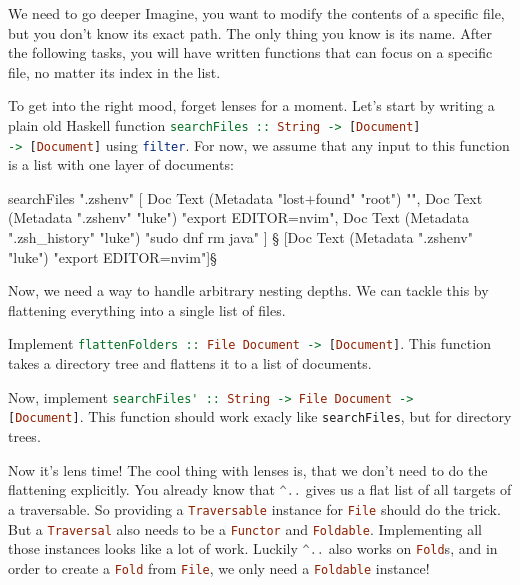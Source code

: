 \documentclass{exercise}
\makeatletter
\def\ergo{\smile@lst@style@comment\raisebox{.1pt}{\scalebox{.8}{\faCaretRight}}}
\newcommand\h[2][]{\lstinline[language=haskell,#1]{#2}}
\def\m#1{\tikzmark{#1}}
\makeatother
\begin{document}
\begin{exercise}{We need to go deeper}
		Imagine, you want to modify the contents of a specific file, but you don't know
		its exact path. The only thing you know is its name. After the following tasks,
		you will have written functions that can focus on a specific file, no matter
		its index in the list.
		\begin{tasks}[resume*]
			\item To get into the right mood, forget lenses for a moment. Let's start by
				writing a plain old Haskell function \h{searchFiles :: String -> [Document]
				-> [Document]} using \h{filter}. For now, we assume that any input to
				this function is a list with one layer of documents:
				\begin{haskell}
searchFiles ".zshenv" [
  Doc Text (Metadata "lost+found" "root") "",
  Doc Text (Metadata ".zshenv" "luke") "export EDITOR=nvim",
  Doc Text (Metadata ".zsh_history" "luke") "sudo dnf rm java"
]
§\ergo{} [Doc Text (Metadata ".zshenv" "luke") "export EDITOR=nvim"]§
				\end{haskell}
		\end{tasks}
		Now, we need a way to handle arbitrary nesting depths. We can tackle this by
		flattening everything into a single list of files.
		\begin{tasks}[resume*]
			\item \m{op1}Implement \h{flattenFolders :: File Document -> [Document]}. This
				function takes a directory tree and flattens it to a list of documents.
			\item \m{op2}Now, implement \h{searchFiles' :: String -> File Document ->
				[Document]}. This function should work exacly like \h{searchFiles}, but
				for directory trees.
		\end{tasks}
		Now it's lens time! The cool thing with lenses is, that we don't need to do the
		flattening explicitly. You already know that \h{^..} gives us a flat list of all
		targets of a traversable. So providing a \h{Traversable} instance for \h{File}
		should do the trick. But a \h{Traversal} also needs to be a \h{Functor} and
		\h{Foldable}. Implementing all those instances looks like a lot of work. Luckily
		\h{^..} also works on \h{Fold}s, and in order to create a \h{Fold} from
		\h{File}, we only need a \h{Foldable} instance!
		\begin{tasks}[resume*]

\end{tasks}
\end{exercise}
\end{document}
